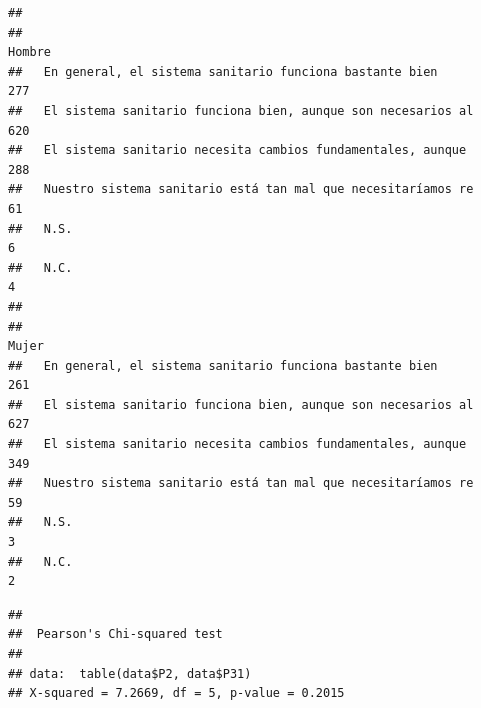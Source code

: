 \documentclass[
]{book}
\newenvironment{Shaded}{\begin{snugshade}}{\end{snugshade}}
\newcommand{\FunctionTok}[1]{\textcolor[rgb]{0.00,0.00,0.00}{#1}}
\newcommand{\NormalTok}[1]{#1}
\newcommand{\SpecialCharTok}[1]{\textcolor[rgb]{0.00,0.00,0.00}{#1}}
\begin{document}
\begin{Shaded}
\end{Shaded}

\begin{verbatim}
##                                                               
##                                                                Hombre
##   En general, el sistema sanitario funciona bastante bien         277
##   El sistema sanitario funciona bien, aunque son necesarios al    620
##   El sistema sanitario necesita cambios fundamentales, aunque     288
##   Nuestro sistema sanitario está tan mal que necesitaríamos re     61
##   N.S.                                                              6
##   N.C.                                                              4
##                                                               
##                                                                Mujer
##   En general, el sistema sanitario funciona bastante bien        261
##   El sistema sanitario funciona bien, aunque son necesarios al   627
##   El sistema sanitario necesita cambios fundamentales, aunque    349
##   Nuestro sistema sanitario está tan mal que necesitaríamos re    59
##   N.S.                                                             3
##   N.C.                                                             2
\end{verbatim}

\begin{Shaded}
\end{Shaded}

\begin{verbatim}
## 
##  Pearson's Chi-squared test
## 
## data:  table(data$P2, data$P31)
## X-squared = 7.2669, df = 5, p-value = 0.2015
\end{verbatim}

\begin{Shaded}
\end{Shaded}
\end{document}
